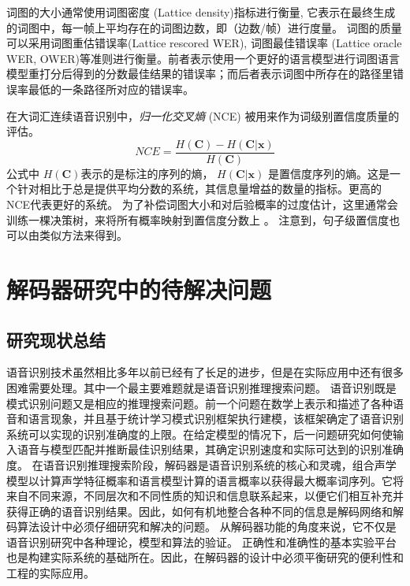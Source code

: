 词图的大小通常使用词图密度 (Lattice density)指标进行衡量, 它表示在最终生成的词图中，每一帧上平均存在的词图边数，即（边数/帧）进行度量。
词图的质量可以采用词图重估错误率(Lattice rescored WER), 词图最佳错误率 (Lattice oracle WER, OWER)等准则进行衡量。前者表示使用一个更好的语言模型进行词图语言模型重打分后得到的分数最佳结果的错误率；而后者表示词图中所存在的路径里错误率最低的一条路径所对应的错误率。

在大词汇连续语音识别中，{\em 归一化交叉熵 } (NCE) \cite{zhc00-chen-icassp2017} 被用来作为词级别置信度质量的评估。
     \begin{equation}\label{eq:nce}
    NCE=\frac{H(\mathbf{C})-H(\mathbf{C}|\mathbf{x})}{H(\mathbf{C})}
     \end{equation}
公式中 $H(\mathbf{C})$表示的是标注的序列的熵， $H(\mathbf{C}|\mathbf{x})$ 是置信度序列的熵。这是一个针对相比于总是提供平均分数的系统，其信息量增益的数量的指标。更高的NCE代表更好的系统。
% 
为了补偿词图大小和对后验概率的过度估计，这里通常会训练一棵决策树，来将所有概率映射到置信度分数上 \cite{evermann2000large}。 注意到，句子级置信度也可以由类似方法来得到。

\section{解码器研究中的待解决问题}
\label{chap:intro2-dec-future}
\subsection{研究现状总结}
\label{chap:intro2-dec-sumcur}

语音识别技术虽然相比多年以前已经有了长足的进步，但是在实际应用中还有很多困难需要处理。其中一个最主要难题就是语音识别推理搜索问题。
%
语音识别既是模式识别问题又是相应的推理搜索问题。前一个问题在数学上表示和描述了各种语音和语言现象，并且基于统计学习模式识别框架执行建模，该框架确定了语音识别系统可以实现的识别准确度的上限。在给定模型的情况下，后一问题研究如何使输入语音与模型匹配并推断最佳识别结果，其确定识别速度和实际可达到的识别准确度。
在语音识别推理搜索阶段，解码器是语音识别系统的核心和灵魂，组合声学模型以计算声学特征概率和语言模型计算的语言概率以获得最大概率词序列。它将来自不同来源，不同层次和不同性质的知识和信息联系起来，以便它们相互补充并获得正确的语音识别结果。因此，如何有机地整合各种不同的信息是解码网络和解码算法设计中必须仔细研究和解决的问题。
从解码器功能的角度来说，它不仅是语音识别研究中各种理论，模型和算法的验证。
正确性和准确性的基本实验平台也是构建实际系统的基础所在。因此，在解码器的设计中必须平衡研究的便利性和工程的实际应用。


